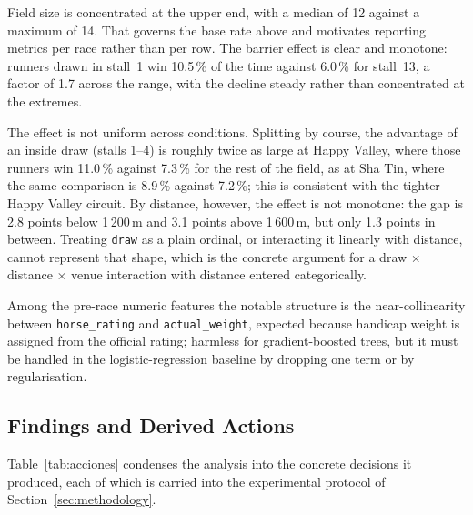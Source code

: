 Field size is concentrated at the upper end, with a median of 12 against
a maximum of 14. That governs the base rate above and motivates
reporting metrics per race rather than per row. The barrier effect is
clear and monotone: runners drawn in stall~1 win 10.5\,\% of the time
against 6.0\,\% for stall~13, a factor of 1.7 across the range, with the
decline steady rather than concentrated at the extremes.

The effect is not uniform across conditions. Splitting by course, the
advantage of an inside draw (stalls 1--4) is roughly twice as large at
Happy Valley, where those runners win 11.0\,\% against 7.3\,\% for the
rest of the field, as at Sha Tin, where the same comparison is 8.9\,\%
against 7.2\,\%; this is consistent with the tighter Happy Valley
circuit. By distance, however, the effect is not monotone: the gap is
2.8 points below 1\,200\,m and 3.1 points above 1\,600\,m, but only
1.3 points in between. Treating \texttt{draw} as a plain ordinal, or
interacting it linearly with distance, cannot represent that shape, which
is the concrete argument for a draw $\times$ distance $\times$ venue
interaction with distance entered categorically.

Among the pre-race numeric
features the notable structure is the near-collinearity between
\texttt{horse\_rating} and \texttt{actual\_weight}, expected because
handicap weight is assigned from the official rating; harmless for
gradient-boosted trees, but it must be handled in the logistic-regression
baseline by dropping one term or by regularisation.

\subsection{Findings and Derived Actions}
\label{sec:actions}

Table~\ref{tab:acciones} condenses the analysis into the concrete
decisions it produced, each of which is carried into the experimental
protocol of Section~\ref{sec:methodology}.

